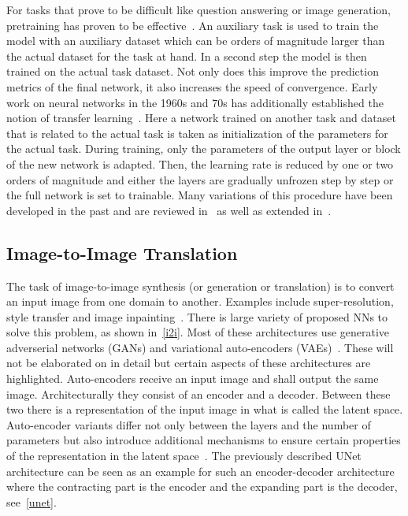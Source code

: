 For tasks that prove to be difficult like question answering or image generation, pretraining has proven to be effective~\autocite{radford_improving_nodate, wang_pretraining_2022}.
An auxiliary task is used to train the model with an auxiliary dataset which can be orders of magnitude larger than the actual dataset for the task at hand.
In a second step the model is then trained on the actual task dataset.
Not only does this improve the prediction metrics of the final network, it also increases the speed of convergence.
Early work on neural networks in the 1960s and 70s has additionally established the notion of transfer learning~\autocite{bozinovski_reminder_2020}.
Here a network trained on another task and dataset that is related to the actual task is taken as initialization of the parameters for the actual task.
During training, only the parameters of the output layer or block of the new network is adapted.
Then, the learning rate is reduced by one or two orders of magnitude and either the layers are gradually unfrozen step by step or the full network is set to trainable.
Many variations of this procedure have been developed in the past and are reviewed in~\autocite{peters_tune_2019} as well as extended in~\autocite{dale_fine-tuning_2024}.

\subsection{Image-to-Image Translation}
The task of image-to-image synthesis (or generation or translation) is to convert an input image from one domain to another.
Examples include super-resolution, style transfer and image inpainting~\autocite{pang_image-image_2021}.
There is large variety of proposed NNs to solve this problem, as shown in~\ref{i2i}.
Most of these architectures use generative adverserial networks (GANs) and variational auto-encoders (VAEs)~\autocite{goodfellow_generative_2020, kingma_auto-encoding_2022}.
These will not be elaborated on in detail but certain aspects of these architectures are highlighted.
Auto-encoders receive an input image and shall output the same image.
Architecturally they consist of an encoder and a decoder.
Between these two there is a representation of the input image in what is called the latent space.
Auto-encoder variants differ not only between the layers and the number of parameters but also introduce additional mechanisms to ensure certain properties of the representation in the latent space~\autocite{goodfellow_deep_2016}.
The previously described UNet architecture can be seen as an example for such an encoder-decoder architecture where the contracting part is the encoder and the expanding part is the decoder, see~\ref{unet}. \\

